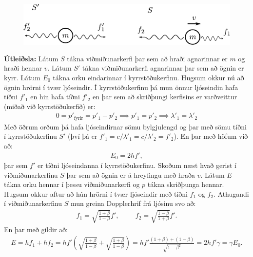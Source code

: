 \begin{figure}[H]
    \centering
    \includegraphics{figures/ljoseind-hrorna.pdf}
\end{figure}


\textbf{Útleiðsla:} Látum $S$ tákna viðmiðunarkerfi þar sem að hraði agnarinnar er $m$ og hraði hennar $v$. Látum $S'$ tákna viðmiðunarkerfi agnarinnar þar sem að ögnin er kyrr. Látum $E_0$ tákna orku eindarinnar í kyrrstöðukerfinu. Hugsum okkur nú að ögnin hrörni í tvær ljóseindir. Í kyrrstöðukerfinu þá mun önnur ljóseindin hafa tíðni $f'_1$ en hin hafa tíðni $f'_2$ en þar sem að skriðþungi kerfisins er varðveittur (miðað við kyrrstöðukerfið) er:
\begin{align*}
   0 = p'_{\text{fyrir}} = p'_1 - p'_2 \implies p'_1 = p'_2 \implies \lambda'_1 = \lambda'_2
\end{align*}
Með öðrum orðum þá hafa ljóseindirnar sömu bylgjulengd og þar með sömu tíðni í kyrrstöðukerfinu $S'$ (því þá er $f'_1 = c/\lambda'_1 = c/\lambda'_2 = f'_2$). En þar með höfum við að:
\begin{align*}
    E_0 = 2hf',
\end{align*}
þar sem $f'$ er tíðni ljóseindanna í kyrrstöðukerfinu. Skoðum næst hvað gerist í viðmiðunarkerfinu $S$ þar sem að ögnin er á hreyfingu með hraða $v$. Látum $E$ tákna orku hennar í þessu viðmiðunarkerfi og $p$ tákna skriðþunga hennar. Hugsum okkur aftur að hún hrörni í tvær ljóseindir með tíðni $f_1$ og $f_2$. Athugandi í viðmiðunarkerfinu $S$ mun greina Dopplerhrif frá ljósinu svo að:
\begin{align*}
    f_1 = \sqrt{\frac{1+\beta}{1-\beta}}f', \hspace{1cm} f_2 = \sqrt{\frac{1-\beta}{1+\beta}}f'.
\end{align*}
En þar með gildir að:
\begin{align*}
    E = hf_1 + hf_2 = hf' \left( \sqrt{\frac{1+\beta}{1-\beta}} + \sqrt{\frac{1+\beta}{1-\beta}}  \right) = hf' \frac{(1 + \beta) + (1-\beta)}{\sqrt{1-\beta^2}} = 2hf' \gamma = \gamma E_0.
\end{align*}

